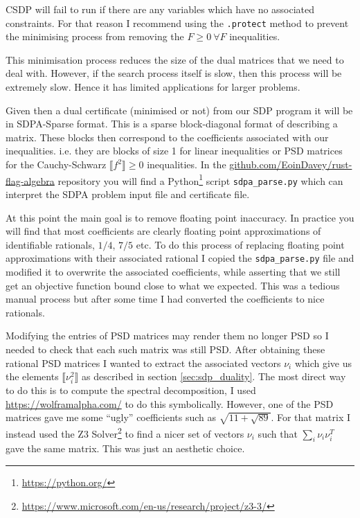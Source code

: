\begin{note*}
    CSDP will fail to run if there are any variables which have no associated constraints.
    For that reason I recommend using the \verb|.protect| method to prevent the minimising
    process from removing the $F \geq 0\ \forall F$ inequalities.
\end{note*}

This minimisation process reduces the size of the dual matrices that we need to deal with.
However, if the search process itself is slow, then this process will be extremely slow.
Hence it has limited applications for larger problems.

Given then a dual certificate (minimised or not) from our SDP program it will be in
SDPA-Sparse format. This is a sparse block-diagonal format of describing a matrix.
These blocks then correspond to the coefficients associated with our inequalities. i.e.
they are blocks of size 1 for linear inequalities or PSD matrices for the Cauchy-Schwarz
$\llbracket f^2 \rrbracket \geq 0$ inequalities. In the
\url{github.com/EoinDavey/rust-flag-algebra} repository you will find a
Python\footnote{\url{https://python.org/}} script \verb|sdpa_parse.py| which can
interpret the SDPA problem input file and certificate file.

At this point the main goal is to remove floating point inaccuracy. In practice you
will find that most coefficients are clearly floating point approximations of identifiable
rationals, $1/4$, $7/5$ etc. To do this process of replacing floating point approximations with
their associated rational I copied the \verb|sdpa_parse.py| file and modified it to
overwrite the associated coefficients, while asserting that we still get an
objective function bound close to what we expected.
This was a tedious manual process but after some time I had converted the coefficients to
nice rationals.

Modifying the entries of PSD matrices may render them no longer PSD so
I needed to check that each such matrix was still PSD. After obtaining these rational
PSD matrices I wanted to extract the associated vectors $\nu_i$ which give us the
elements $\llbracket \nu_i^2 \rrbracket$ as described in section \ref{sec:sdp_duality}.
The most direct way to do this is to compute the spectral decomposition, I used
\url{https://wolframalpha.com/} to do this symbolically. However, one of the PSD matrices
gave me some ``ugly'' coefficients such as $\sqrt{11 + \sqrt{89}}$. For that matrix
I instead used the Z3 Solver\footnote{\url{https://www.microsoft.com/en-us/research/project/z3-3/}}
to find a nicer set of vectors $\nu_i$ such that $\sum_i \nu_i\nu_i^T$ gave the same
matrix. This was just an aesthetic choice.

